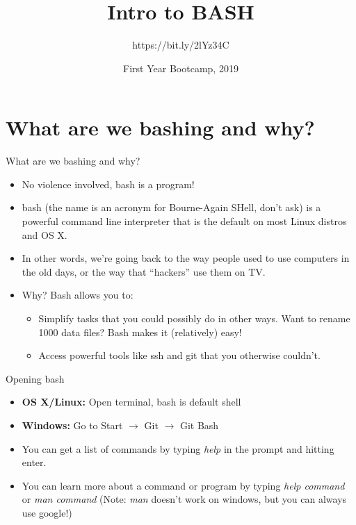 \documentclass{beamer}
\begin{document}
\title{Intro to BASH}
\subtitle{https://bit.ly/2lYz34C}
\author{}
\date{First Year Bootcamp, 2019}
\frame{\titlepage}


\section{What are we bashing and why?}
\begin{frame}{What are we bashing and why?}
\begin{itemize}
    \item<1-> No violence involved, bash is a program!
    \item<2-> bash (the name is an acronym for Bourne-Again SHell, don't ask) is a powerful command line interpreter that is the default on most Linux distros and OS X.
    \item<3-> In other words, we're going back to the way people used to use computers in the old days, or the way that ``hackers'' use them on TV.
    \item<4-> Why? Bash allows you to:
	\begin{itemize}
	    \item<4-> Simplify tasks that you could possibly do in other ways. Want to rename 1000 data files? Bash makes it (relatively) easy! 
	    \item<5-> Access powerful tools like ssh and git that you otherwise couldn't. 
	\end{itemize}
\end{itemize}
\begin{center}
\end{center}
\end{frame}
\begin{frame}[fragile]{Opening bash}
\begin{itemize}
    \item<1-> \textbf{OS X/Linux:} Open terminal, bash is default shell
    \item<1-> \textbf{Windows:} Go to Start $\rightarrow$ Git $\rightarrow$ Git Bash
    \item<2-> You can get a list of commands by typing \emph{help} in the prompt and hitting enter.
    \item<3-> You can learn more about a command or program by typing \emph{help \textit{command}} or \emph{man \textit{command}} (Note: \emph{man} doesn't work on windows, but you can always use google!)
\end{itemize}
\end{frame}
\end{document}
